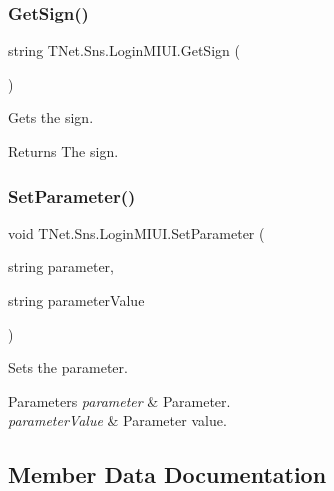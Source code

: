 \subsubsection{\texorpdfstring{Get\+Sign()}{GetSign()}}
{\footnotesize\ttfamily string T\+Net.\+Sns.\+Login\+M\+I\+U\+I.\+Get\+Sign (\begin{DoxyParamCaption}{ }\end{DoxyParamCaption})}



Gets the sign. 

\begin{DoxyReturn}{Returns}
The sign.
\end{DoxyReturn}
\mbox{\label{class_t_net_1_1_sns_1_1_login_m_i_u_i_a6eaebbb32e8dbd9425c792a0e42274b2}} 
\subsubsection{\texorpdfstring{Set\+Parameter()}{SetParameter()}}
{\footnotesize\ttfamily void T\+Net.\+Sns.\+Login\+M\+I\+U\+I.\+Set\+Parameter (\begin{DoxyParamCaption}\item[{string}]{parameter,  }\item[{string}]{parameter\+Value }\end{DoxyParamCaption})}



Sets the parameter. 


\begin{DoxyParams}{Parameters}
{\em parameter} & Parameter.\\
\hline
{\em parameter\+Value} & Parameter value.\\
\hline
\end{DoxyParams}


\subsection{Member Data Documentation}
\mbox{\label{class_t_net_1_1_sns_1_1_login_m_i_u_i_a3d088b38f50219c528a2df58a8eed51e}} 
